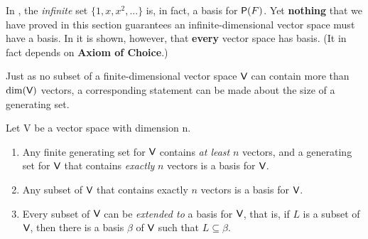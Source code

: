 In , the \emph{infinite} \LID{} set \(\{1, x, x^2, ... \}\) is, in fact, a basis for \(\textsf{P}(F)\).
Yet \textbf{nothing} that we have proved in this section guarantees an infinite-dimensional vector space must have a basis.
In  it is shown, however, that \textbf{every} vector space has basis. (It in fact depends on \textbf{Axiom of Choice}.)

Just as no \LID{} subset of a finite-dimensional vector space \(\textsf{V}\) can contain more than \(\dim(\textsf{V})\) vectors, a corresponding statement can be
made about the size of a generating set.

\begin{corollary} \label{corollary 1.10.3}
Let V be a vector space with dimension n.
\begin{enumerate}
\item Any finite generating set for \(\textsf{V}\) contains \emph{at least} \(n\) vectors, and a generating set for \(\textsf{V}\) that contains \emph{exactly} \(n\) vectors is a basis for \(\textsf{V}\).
\item Any \LID{} subset of \(\textsf{V}\) that contains exactly \(n\) vectors is a basis for \(\textsf{V}\).
\item Every \LID{} subset of \(\textsf{V}\) can be \textit{extended to} a basis for \(\textsf{V}\),
    that is, if \(L\) is a \LID{} subset of \(\textsf{V}\), then there is a basis \(\beta\) of \(\textsf{V}\) such that \(L \subseteq \beta\).
\end{enumerate}
\end{corollary}

